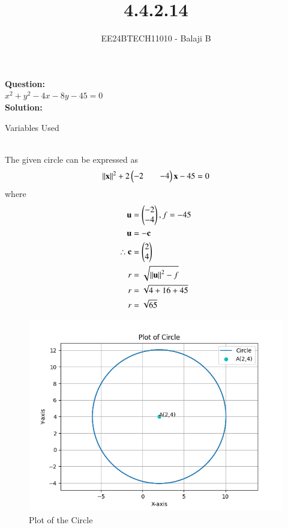 \documentclass[journal]{IEEEtran}
\begin{document}

\vspace{3cm}

\title{4.4.2.14}
\author{EE24BTECH11010 - Balaji B}
{\let\newpage\relax\maketitle}
\textbf{Question:}\\
$x^2 + y^2 - 4x - 8y - 45 = 0$ \\
\textbf{Solution:}\\
\begin{table}[h!]    
  \centering
  
  \caption{Variables Used}
  \label{tab1-1.9-6}
  \end{table}\\
  The given circle can be expressed as \\
  \begin{align}
      \left\lVert\mathbf{x}\right\rVert^2 +2\begin{pmatrix}-2 && -4\end{pmatrix}\mathbf{x} - 45 = 0
  \end{align}
  where 
  \begin{align}
      \mathbf{u} &= \begin{pmatrix}-2 \\ -4\end{pmatrix}, f = -45 \\
      \mathbf{u} &= -\mathbf{c}\\
       \therefore \mathbf{c} &= \begin{pmatrix}2 \\ 4\end{pmatrix}\\
	  r &= \sqrt{\left\lVert\mathbf{u}\right\rVert^2 - f} \\
      r &= \sqrt{4 + 16 + 45} \\
      r &= \sqrt{65}
  \end{align}

  \begin{figure}[h!]
  \centering
  \includegraphics[width=0.7\linewidth]{figs/fig.png}
  \caption{Plot of the Circle}
   \label{stemplot}
\end{figure}
\end{document}
